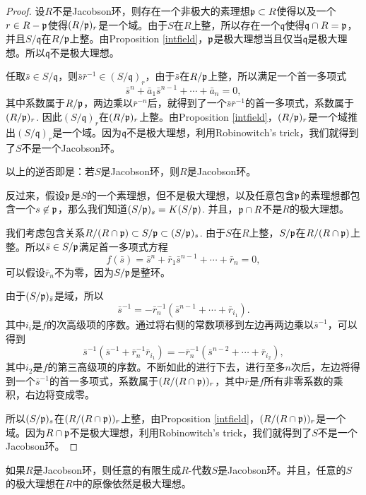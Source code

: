 \begin{proof}
	设$R$不是Jacobson环，则存在一个非极大的素理想$\mathfrak{p}\subset R$使得以及一个$r\in R-\mathfrak{p}$使得$(R/\mathfrak{p})_r$是一个域。由于$S$在$R$上整，所以存在一个$\mathfrak{q}$使得$\mathfrak{q}\cap R=\mathfrak{p}$，并且$S/\mathfrak{q}$在$R/\mathfrak{p}$上整。由Proposition \ref{intfield}，$\mathfrak{p}$是极大理想当且仅当$\mathfrak{q}$是极大理想。所以$\mathfrak{q}$不是极大理想。

	任取$\bar{s}\in S/\mathfrak{q}$，则$\bar{s}\bar{r}^{-1}\in (S/\mathfrak{q})_r$，由于$\bar{s}$在$R/\mathfrak{p}$上整，所以满足一个首一多项式
	\[
	\bar{s}^n+\bar{a}_1\bar{s}^{n-1}+\cdots+ \bar{a}_n=0,
	\]
	其中系数属于$R/\mathfrak{p}$，两边乘以$\bar{r}^{-n}$后，就得到了一个$\bar{s}\bar{r}^{-1}$的首一多项式，系数属于$(R/\mathfrak{p})_r$. 因此$(S/\mathfrak{q})_r$在$(R/\mathfrak{p})_r$上整。由Proposition \ref{intfield}，$(R/\mathfrak{p})_r$是一个域推出$(S/\mathfrak{q})_r$是一个域。因为$\mathfrak{q}$不是极大理想，利用Robinowitch's trick，我们就得到了$S$不是一个Jacobson环。

	以上的逆否即是：若$S$是Jacobson环，则$R$是Jacobson环。

	反过来，假设$\mathfrak{p}$是$S$的一个素理想，但不是极大理想，以及任意包含$\mathfrak{p}$的素理想都包含一个$s\not\in \mathfrak{p}$，那么我们知道$(S/\mathfrak{p})_{s}=K(S/\mathfrak{p})$. 并且，$\mathfrak{p} \cap R$不是$R$的极大理想。

	我们考虑包含关系$R/(R\cap \mathfrak{p})\subset S/\mathfrak{p}\subset (S/\mathfrak{p})_{s}$. 由于$S$在$R$上整，$S/\mathfrak{p}$在$R/(R\cap \mathfrak{p})$上整。所以$\bar{s}\in S/\mathfrak{p}$满足首一多项式方程
	\[
	f(\bar{s})=\bar{s}^n+\bar{r}_1\bar{s}^{n-1}+\cdots+\bar{r}_n=0,
	\]
	可以假设$\bar{r}_n$不为零，因为$S/\mathfrak{p}$是整环。

	由于$(S/\mathfrak{p})_{\bar{s}}$是域，所以
	\[
	\bar{s}^{-1}=-\bar{r}_n^{-1}(\bar{s}^{n-1}+\cdots+\bar{r}_{i_1}).
	\]
	其中$i_i$是$f$的次高级项的序数。通过将右侧的常数项移到左边再两边乘以$\bar{s}^{-1}$，可以得到
	\[
	\bar{s}^{-1}(\bar{s}^{-1}+\bar{r}_n^{-1}\bar{r}_{i_1})=-\bar{r}_n^{-1}(\bar{s}^{n-2}+\cdots+\bar{r}_{i_2}),
	\]
	其中$i_2$是$f$的第三高级项的序数。不断如此的进行下去，进行至多$n$次后，左边将得到一个$\bar{s}^{-1}$的首一多项式，系数属于$(R/(R\cap \mathfrak{p}))_{r}$，其中$\bar{r}$是$f$所有非零系数的乘积，右边将变成零。

	所以$(S/\mathfrak{p})_{s}$在$(R/(R\cap \mathfrak{p}))_{r}$上整，由Proposition \ref{intfield}，$(R/(R\cap \mathfrak{p}))_{r}$是一个域。因为$R\cap \mathfrak{p}$不是极大理想，利用Robinowitch's trick，我们就得到了$S$不是一个Jacobson环。
\end{proof}

\begin{thm}
如果$R$是Jacobson环，则任意的有限生成$R$-代数$S$是Jacobson环。并且，任意的$S$的极大理想在$R$中的原像依然是极大理想。
\end{thm}

